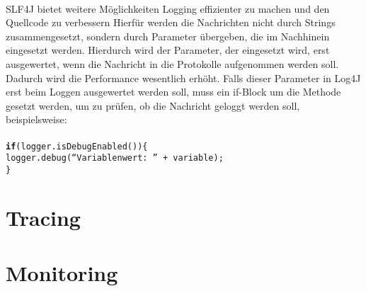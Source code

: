 {\\
SLF4J bietet weitere Möglichkeiten Logging effizienter zu machen und den Quellcode zu verbessern
Hierfür werden die Nachrichten nicht durch Strings zusammengesetzt, sondern durch Parameter übergeben, die im Nachhinein eingesetzt werden.
Hierdurch wird der Parameter, der eingesetzt wird, erst ausgewertet, wenn die Nachricht in die Protokolle aufgenommen werden soll.
Dadurch wird die Performance wesentlich erhöht.
Falls dieser Parameter in Log4J erst beim Loggen ausgewertet werden soll, muss ein if-Block um die Methode gesetzt werden, um zu prüfen, ob die Nachricht geloggt werden soll, beispielsweise:
\\
\\
\hspace*{10mm}
\texttt{\textbf{if}(logger.isDebugEnabled())\{
\\
\hspace*{15mm}
logger.debug(\enquote{Variablenwert: } + variable);
\\
\hspace*{10mm}
\}
}
}


\section{Tracing}\label{sec:tracing-verfahren}



\section{Monitoring}\label{sec:monitoring-verfahren}




